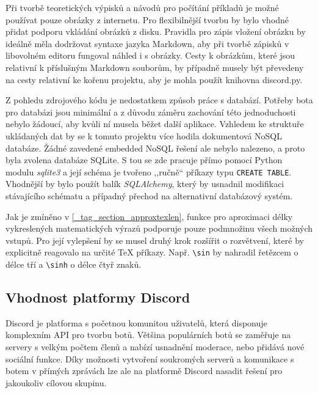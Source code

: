 \documentclass[FM]{tulthesis}
\begin{document}
	Při tvorbě teoretických výpisků a návodů pro počítání příkladů je možné \mbox{používat} pouze obrázky z internetu. Pro flexibilnější tvorbu by bylo vhodné přidat podporu vkládání obrázků z disku. Pravidla pro zápis vložení obrázku by ideálně měla dodržovat syntaxe jazyka Markdown, aby při tvorbě zápisků v libovolném editoru fungoval náhled i s obrázky. Cesty k obrázkům, které jsou relativní k příslušným Markdown souborům, by případně musely být převedeny na cesty relativní ke kořenu projektu, aby je mohla použít knihovna discord.py.
	
	Z pohledu zdrojového kódu je nedostatkem způsob práce s databází. Potřeby bota pro databázi jsou minimální a z důvodu záměru zachování této jednoduchosti nebylo žádoucí, aby kvůli ní musela běžet další aplikace. Vzhledem ke struktuře ukládaných dat by se k tomuto projektu více hodila dokumentová NoSQL databáze. Žádné zavedené embedded NoSQL řešení ale nebylo nalezeno, a proto byla zvolena databáze SQLite. S tou se zde pracuje přímo pomocí Python modulu \textit{sqlite3} a její schéma je tvořeno ,,ručně`` příkazy typu \verb|CREATE TABLE|. Vhodnější by bylo použít balík \textit{SQLAlchemy}, který by usnadnil modifikaci stávajícího schématu a případný přechod na alternativní databázový systém.
	
	Jak je zmíněno v \ref{_tag_section_approxtexlen}, funkce pro aproximaci délky vykreslených matematických výrazů podporuje pouze podmnožinu všech možných vstupů. Pro její vylepšení by se musel druhý krok rozšířit o rozvětvení, které by explicitně reagovalo na určité TeX příkazy. Např. \verb|\sin| by nahradil řetězcem o délce tří a \verb|\sinh| o délce čtyř znaků. 
	
		
	\subsection{Vhodnost platformy Discord}
	
	Discord je platforma s početnou komunitou uživatelů, která disponuje komplexním API pro tvorbu botů. Většina populárních botů se zaměřuje na servery s velkým počtem členů a nabízí usnadnění moderace, nebo přidává nové sociální funkce. Díky možnosti vytvoření soukromých serverů a komunikace s botem v přímých zprávách lze ale na platformě Discord nasadit řešení pro jakoukoliv cílovou skupinu.
	
\end{document}
